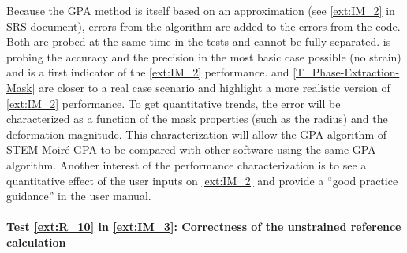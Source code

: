 \documentclass[12pt, titlepage]{article}
\newcommand{\progname}{STEM Moir{\'e} GPA}
\begin{document}
Because the GPA method is itself based on an approximation (see
\cref{ext:IM_2} in SRS document), errors from the algorithm are added
to the errors from the code. Both are probed at the same time in the
tests and cannot be fully
separated.  is probing the accuracy
and the precision in the most basic case possible (no strain) and is a
first indicator of the \cref{ext:IM_2}
performance.  and
\cref{T_Phase-Extraction-Mask} are closer to a real case scenario and
highlight a more realistic version of \cref{ext:IM_2} performance. To
get quantitative trends, the error will be characterized as a function
of the mask properties (such as the radius) and the deformation
magnitude. This characterization will allow the GPA algorithm of
\progname{} to be compared with other software using the same GPA
algorithm. Another interest of the performance characterization is to
see a quantitative effect of the user inputs on \cref{ext:IM_2} and
provide a ``good practice guidance'' in the user manual.  

\paragraph{Test \cref{ext:R_10} in \cref{ext:IM_3}: Correctness of the unstrained reference calculation}	
\end{document}
